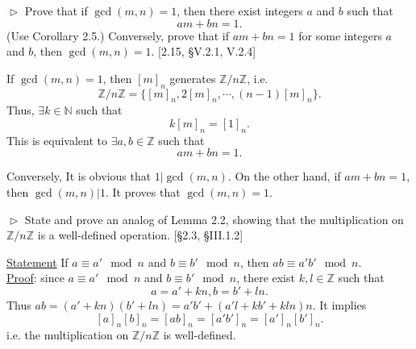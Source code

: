 \hypertarget{Exercise II.2.13}{}
\begin{problem}[2.13]
$\vartriangleright$ Prove that if $\gcd(m, n) = 1$, then there exist integers $a$ and $b$ such that
$$am + bn = 1.$$ 
(Use Corollary 2.5.) Conversely, prove that if $am+bn = 1$ for some integers $a$ and $b$,
then $\gcd(m, n) = 1$. [2.15, \S V.2.1, V.2.4]
\end{problem}

\begin{solution}
If $\gcd(m, n) = 1$, then $[m]_n$ generates $\mathbb{Z}/n\mathbb{Z}$, i.e.
$$\mathbb{Z}/n\mathbb{Z} = \{[m]_n, 2[m]_n, \cdots, (n-1)[m]_n\}.$$
Thus, $\exists k\in \mathbb{N}$ such that $$k[m]_n = [1]_n.$$ This is equivalent to $\exists a,b\in\mathbb{Z}$ such that 
$$am + bn = 1.$$

Conversely, It is obvious that $1 | \gcd(m,n)$. On the other hand, if $am+bn = 1$, then $\gcd(m,n) | 1$. It proves that $\gcd(m,n)=1$.
\end{solution}

\begin{problem}[2.14]
$\vartriangleright$ State and prove an analog of Lemma 2.2, showing that the multiplication
on $\mathbb{Z}/n\mathbb{Z}$ is a well-defined operation. [\S 2.3, \S III.1.2]
\end{problem}
\begin{solution}
\underline{Statement} If $a\equiv a' \mod n$ and $b\equiv b'\mod n$, then $ab \equiv a'b'\mod n$.\\
\underline{Proof}: since $a\equiv a' \mod n$ and $b\equiv b'\mod n$, there exist $k,l\in\mathbb{Z}$ such that
$$a=a'+kn, b=b'+ln.$$
Thus 
$ab=(a'+kn)(b'+ln) = a'b'+(a'l+kb'+kln)n$. It implies $$[a]_n[b]_n=[ab]_n=[a'b']_n=[a']_n[b']_n.$$
i.e. the multiplication on $\mathbb{Z}/n\mathbb{Z}$ is well-defined.
\end{solution}


